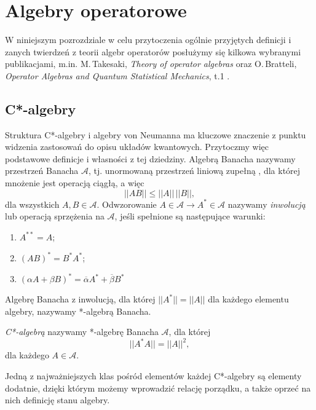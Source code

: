 \section{Algebry operatorowe}
W niniejszym pozrozdziale w celu przytoczenia ogólnie przyjętych definicji
i zanych twierdzeń z teorii algebr operatorów posłużymy się kilkowa wybranymi
publikacjami, m.in.
M.\,Takesaki, \emph{Theory of operator algebras} \cite{Takesaki1} oraz
O.\,Bratteli, \emph{Operator Algebras and Quantum Statistical Mechanics}, t.1
\cite{Bratteli2003}.

\subsection{C*-algebry}
Struktura C*-algebry i algebry von Neumanna ma kluczowe znaczenie z punktu widzenia
zastosowań do opisu układów kwantowych.
Przytoczmy więc podstawowe definicje i własności z tej dziedziny.
Algebrą Banacha nazywamy przestrzeń Banacha $\mathcal{A}$,
tj. unormowaną przestrzeń
liniową zupełną \cite{Rudin1991}, dla której mnożenie jest
operacją ciągłą, a więc
\begin{equation}
 \label{eq:algBanachMultiplication}
|| A B || \leq ||A|| \, ||B||,
\end{equation}
dla wszystkich $A, B \in \mathcal{A}$.
Odwzorowanie $A \in \mathcal{A} \rightarrow A^{*} \in \mathcal{A}$ nazywamy
\emph{inwolucją}  lub
operacją sprzężenia na $\mathcal{A}$, jeśli spełnione są następujące warunki:
\begin{enumerate}
 \item $A^{**} = A$;
 \item $(AB)^{*} = B^{*} A^{*}$;
 \item $(\alpha A + \beta B)^{*} = %
  \overline{\alpha} A^{*} + \overline{\beta} B^{*}$
\end{enumerate}
Algebrę Banacha z inwolucją, dla której
$||A^{*}|| = ||A||$ dla każdego elementu
algebry, nazywamy *-algebrą Banacha.


\begin{Definition}
 \label{def:c*alg}
  \emph{C*-algebrą} nazywamy *-algebrę Banacha $\mathcal{A}$, dla której
\begin{equation}
 || A^{*} A || = ||A||^{2},
\end{equation}
dla każdego $A \in \mathcal{A}$.
\end{Definition}

Jedną z najważniejszych klas pośród elementów każdej C*-algebry są
elementy dodatnie, dzięki którym możemy wprowadzić relację
porządku, a także oprzeć na nich definicję stanu algebry.

